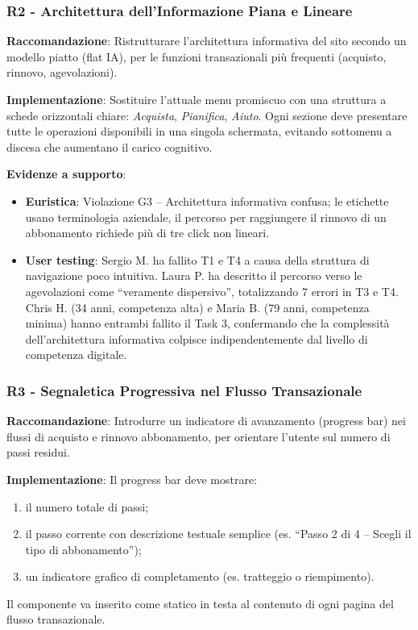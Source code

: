 ﻿\documentclass[11pt,a4paper]{article}
\begin{document}
\subsubsection{R2 - Architettura dell'Informazione Piana e Lineare}
\label{rec:R2}

\textbf{Raccomandazione}: Ristrutturare l’architettura informativa del sito
secondo un modello piatto (flat IA), per le funzioni transazionali
pi\`u frequenti (acquisto, rinnovo, agevolazioni).

\textbf{Implementazione}: Sostituire l’attuale menu promiscuo con una
struttura a schede orizzontali chiare: \textit{Acquista}, \textit{Pianifica},
\textit{Aiuto}. Ogni sezione deve presentare tutte le
operazioni disponibili in una singola schermata, evitando sottomenu a discesa
che aumentano il carico cognitivo.

\textbf{Evidenze a supporto}:
\begin{itemize}
    \item \textbf{Euristica}: Violazione G3 -- Architettura informativa
    confusa; le etichette usano terminologia aziendale, il percorso per
    raggiungere il rinnovo di un abbonamento richiede pi\`u di tre click
    non lineari.
    \item \textbf{User testing}: Sergio M. ha fallito T1 e T4 a causa
    della struttura di navigazione poco intuitiva. Laura P. ha descritto
    il percorso verso le agevolazioni come ``veramente dispersivo'',
    totalizzando 7 errori in T3 e T4. Chris H. (34 anni, competenza
    alta) e Maria B. (79 anni, competenza minima) hanno entrambi fallito
    il Task 3, confermando che la complessit\`a dell'architettura
    informativa colpisce indipendentemente dal livello di competenza
    digitale.
\end{itemize}

\subsubsection{R3 - Segnaletica Progressiva nel Flusso Transazionale}
\label{rec:R3}

\textbf{Raccomandazione}: Introdurre un indicatore di avanzamento
(progress bar) nei flussi di acquisto e rinnovo abbonamento,
per orientare l'utente sul numero di passi residui.

\textbf{Implementazione}: Il progress bar deve mostrare:
\begin{enumerate}
    \item il numero totale di passi;
    \item il passo corrente con descrizione testuale semplice (es.
    “Passo 2 di 4 -- Scegli il tipo di abbonamento”);
    \item un indicatore grafico di completamento (es. tratteggio o
    riempimento).
\end{enumerate}
Il componente va inserito come statico in testa al contenuto di ogni
pagina del flusso transazionale.
\end{document}
